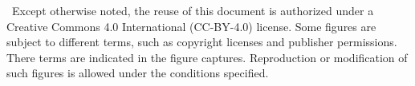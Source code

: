 \usepackage[type={CC}, modifier={by}, version={4.0}]{doclicense-di}

{%
  \copyrighttext%
  {\copyrightmetastring\ Except otherwise noted, the reuse of this
    document is authorized under a Creative Commons 4.0 International
  (CC-BY-4.0) license.}%
  {%
    \copyrightstring
    \doclicenseThis
    \blockpar
    Some figures are subject to different terms, such as copyright
    licenses and publisher permissions. There terms are indicated in
    the figure captures. Reproduction or modification of such figures
    is allowed under the conditions specified.
  }
}
